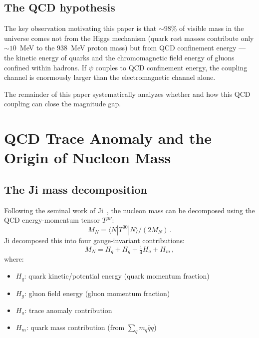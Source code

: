 \documentclass[aps,prd,twocolumn,superscriptaddress,floatfix,nofootinbib]{revtex4-2}
\begin{document}
\subsection{The QCD hypothesis}

The key observation motivating this paper is that $\sim 98\%$ of visible mass in
the universe comes not from the Higgs mechanism (quark rest masses contribute
only $\sim 10$~MeV to the $938$~MeV proton mass) but from QCD confinement
energy --- the kinetic energy of quarks and the chromomagnetic field energy of
gluons confined within hadrons. If $\psi$ couples to QCD confinement energy, the
coupling channel is enormously larger than the electromagnetic channel alone.

The remainder of this paper systematically analyzes whether and how this QCD
coupling can close the magnitude gap.


\section{QCD Trace Anomaly and the Origin of Nucleon Mass}
\label{sec:trace_anomaly}

\subsection{The Ji mass decomposition}

Following the seminal work of Ji~\cite{Ji1995}, the nucleon mass can be
decomposed using the QCD energy-momentum tensor $T^{\mu\nu}$:
\begin{equation}
M_N = \langle N | T^{00} | N \rangle / (2M_N) \, .
\end{equation}
Ji decomposed this into four gauge-invariant contributions:
\begin{equation}
M_N = H_q + H_g + \tfrac{1}{4} H_a + H_m \, ,
\label{eq:ji_decomp}
\end{equation}
where:
\begin{itemize}
\item $H_q$: quark kinetic/potential energy (quark momentum fraction)
\item $H_g$: gluon field energy (gluon momentum fraction)
\item $H_a$: trace anomaly contribution
\item $H_m$: quark mass contribution (from $\sum_q m_q \bar{q} q$)
\end{itemize}
\end{document}
